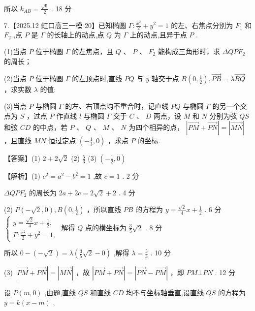 \documentclass[10pt]{article}
\begin{document}
所以 \({k}_{AB} = \frac{\sqrt{6}}{2}\) . 18 分

7.【2025.12 虹口高三一模 20】已知椭圆 \(\Gamma  : \frac{{x}^{2}}{2} + {y}^{2} = 1\) 的左、右焦点分别为 \({F}_{1}\) 和 \({F}_{2}\) ,点 \(P\) 是 \(\Gamma\) 的长轴上的动点,点 \(Q\) 为 \(\Gamma\) 上的动点,且异于点 \(P\) .

(1)当点 \(P\) 位于椭圆 \(\Gamma\) 的左焦点，且 \(Q\) 、 \(P\) 、 \({F}_{2}\) 能构成三角形时，求 \({\Delta QP}{F}_{2}\) 的周长；

(2)当点 \(P\) 位于椭圆 \(\Gamma\) 的左顶点时,直线 \({PQ}\) 与 \(y\) 轴交于点 \(B\left( {0,\frac{1}{2}}\right) ,\overrightarrow{PB} = \lambda \overrightarrow{BQ}\) ，求实数 \(\lambda\) 的值:

(3)当点 \(P\) 与椭圆 \(\Gamma\) 的左、右顶点均不重合时，记直线 \({PQ}\) 与椭圆 \(\Gamma\) 的另一个交点为 \(S\) ，过点 \(P\) 作直线 \(l\) 与椭圆 \(\Gamma\) 交于 \(C\) 、 \(D\) 两点，设 \(M\) 和 \(N\) 分别为弦 \({QS}\) 和弦 \({CD}\) 的中点，若 \(P\) 、 \(Q\) 、 \(M\) 、 \(N\) 为四个相异的点， \(\left| {\overrightarrow{PM} + \overrightarrow{PN}}\right|  = \left| \overrightarrow{MN}\right|\) ，且直线 \({MN}\) 恒过定点 \(\left( {-\frac{1}{3},0}\right)\) ，求点 \(P\) 的坐标.

【答案】(1) \(2 + 2\sqrt{2}\) (2) \(\frac{5}{3}\) (3) \(\left( {-\frac{1}{2},0}\right)\)

【解析】(1) \({c}^{2} = {a}^{2} - {b}^{2} = 1\) ,故 \(c = 1\) . 2 分

\({\Delta QP}{F}_{2}\) 的周长为 \({2a} + {2c} = 2\sqrt{2} + 2\) . 4 分

(2) \(P\left( {-\sqrt{2},0}\right) ,B\left( {0,\frac{1}{2}}\right)\) ，所以直线 \({PB}\) 的方程为 \(y = \frac{\sqrt{2}}{4}x + \frac{1}{2}\) . 6 分 \(\left\{  \begin{array}{l} y = \frac{\sqrt{2}}{4}x + \frac{1}{2}, \\  \Gamma  : \frac{{x}^{2}}{2} + {y}^{2} = 1, \end{array}\right.\) 解得 \(Q\) 点的横坐标为 \(\frac{3}{5}\sqrt{2}\) . 8 分

所以 \(0 - \left( {-\sqrt{2}}\right)  = \lambda \left( {\frac{3}{5}\sqrt{2} - 0}\right)\) ,解得 \(\lambda  = \frac{5}{3}\) . 10 分

(3) \(\left| {\overrightarrow{PM} + \overrightarrow{PN}}\right|  = \left| \overrightarrow{MN}\right|\) ，故 \(\left| {\overrightarrow{PM} + \overrightarrow{PN}}\right|  = \left| {\overrightarrow{PN} - \overrightarrow{PM}}\right|\) ，即 \({PM}\bot {PN}\) . 12 分

设 \(P\left( {m,0}\right)\) ,由题,直线 \({QS}\) 和直线 \({CD}\) 均不与坐标轴垂直,设直线 \({QS}\) 的方程为 \(y = k\left( {x - m}\right)\) ,
\end{document}
